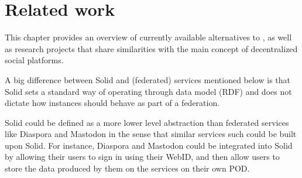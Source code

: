 \chapter{Related work}
\label{chap:num_2}

This chapter provides an overview of currently available alternatives to \solid{}, as well as research projects that share similarities with the main concept of decentralized social platforms.

A big difference between Solid and (federated) services mentioned below is that Solid sets a standard way of operating through data model (RDF) and does not dictate how instances should behave as part of a federation.

Solid could be defined as a more lower level abstraction than federated services like Diaspora and Mastodon in the sense that similar services such could be built upon Solid. For instance, Diaspora and Mastodon could be integrated into Solid by allowing their users to sign in using their WebID, and then allow users to store the data produced by them on the services on their own POD. 



